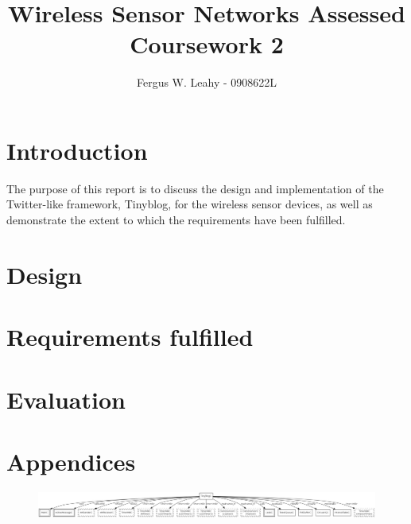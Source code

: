 \documentclass{article}
\author{Fergus W. Leahy - 0908622L}
\title{Wireless Sensor Networks Assessed Coursework 2}
\begin{document}
\maketitle{}

\section{Introduction}
The purpose of this report is to discuss the design and implementation of the Twitter-like framework, Tinyblog, for the wireless sensor devices, as well as demonstrate the extent to which the requirements have been fulfilled.  

\section{Design}
\begin{center}

\section{Requirements fulfilled}


\section{Evaluation}


\section{Appendices}
\begin{figure}[htb!]
\centering
\includegraphics[scale=.27,angle=90]{TinyBlogAppC.png}
\end{figure}
\end{center}
\end{document}
